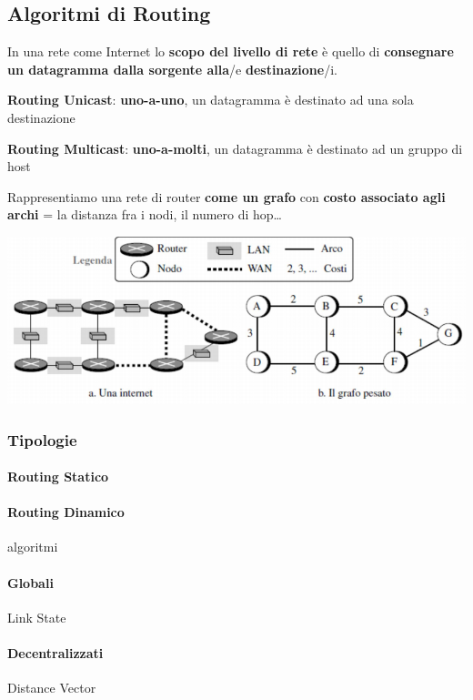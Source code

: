\documentclass[10pt]{article}
\begin{document}
\subsection{Algoritmi di Routing}
In una rete come Internet lo \textbf{scopo del livello di rete} è quello di \textbf{consegnare un datagramma dalla sorgente alla}/e \textbf{destinazione}/i.
\begin{list}{}{}
\item \textbf{Routing Unicast}: \textbf{uno-a-uno}, un datagramma è destinato ad una sola destinazione
\item \textbf{Routing Multicast}: \textbf{uno-a-molti}, un datagramma è destinato ad un gruppo di host
\end{list}
Rappresentiamo una rete di router \textbf{come un grafo} con \textbf{costo associato agli archi} = la distanza fra i nodi, il numero di hop\ldots
\begin{center}
\includegraphics[scale=0.7]{routergrafo.png}
\end{center}
\pagebreak
\subsubsection{Tipologie}
\paragraph{Routing Statico}
\paragraph{Routing Dinamico} algoritmi
\paragraph{Globali} Link State
\paragraph{Decentralizzati} Distance Vector
\pagebreak
\end{document}
